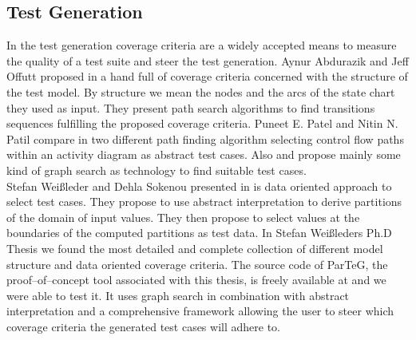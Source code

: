 \subsection{Test Generation}
In the test generation coverage criteria are a widely accepted means to measure the quality of a test suite and steer the test generation. Aynur Abdurazik and Jeff Offutt proposed in \cite{Offutt:1999:GeneratingTestsFromUmlSpec} a hand full of coverage criteria concerned with the structure of the test model. By structure we mean the nodes and the arcs of the state chart they used as input. They present path search algorithms to find transitions sequences fulfilling the proposed coverage criteria.
Puneet E. Patel and Nitin N. Patil compare in \cite{Patel12TestCaseFormationUsigUMLActivityDiagram} two different path finding algorithm selecting control flow paths within an activity diagram as abstract test cases. Also \cite{kundu2009novel} and \cite{Linzhang04GeneratingTestCasefromActivityGrayBoxMethod} propose mainly some kind of graph search as technology to find suitable test cases.\\
Stefan Wei{\ss}leder and Dehla Sokenou presented in \cite{weissleder2008automatic} is data oriented approach to select test cases. They propose to use abstract interpretation to derive partitions of the domain of input values. They then propose to select values at the boundaries of the computed partitions as test data.
In Stefan Wei{\ss}leders Ph.D Thesis \cite{ParTeG} we found the most detailed and complete collection of different model structure and data oriented coverage criteria. The source code of ParTeG, the proof--of--concept tool associated with this thesis, is freely available at \cite{sf.parteg} and we were able to test it. It uses graph search in combination with abstract interpretation and a comprehensive framework allowing the user to steer which coverage criteria the generated test cases will adhere to.\\
